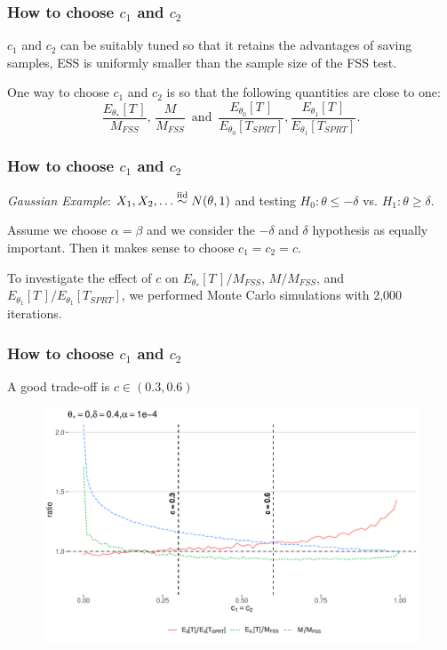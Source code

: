 \documentclass[10pt]{beamer}
\begin{document}
\begin{frame}
\frametitle{How to choose $c_1$ and $c_2$}

$c_1$ and $c_2$ can be suitably tuned so that it retains the advantages of saving samples, ESS is uniformly smaller than the sample size of the FSS test.

One way to choose $c_1$ and $c_2$ is so that the following quantities are close to one:
\[
\frac{E_{\theta_{*}}[T\,]}{M_{FSS}}, \, \frac{M}{M_{FSS}}  \, \text{ and } \, \frac{E_{\theta_0}[T\,]}{E_{\theta_0}[T_{SPRT}]}, \frac{E_{\theta_1}[T\,]}{E_{\theta_1}[T_{SPRT}]}.
\]

\end{frame}

\begin{frame}
\frametitle{How to choose $c_1$ and $c_2$}
\textit{Gaussian Example}: $X_1, X_2, \dots  \overset{\text{iid}}\sim N(\theta, 1)$ and testing $H_0: \theta \leq -\delta$ vs. $H_1: \theta \geq \delta$.

Assume we choose $\alpha = \beta$ and we consider the $-\delta$ and $\delta$ hypothesis as equally important. Then it makes sense to choose $c_1 = c_2 = c$.

To investigate the effect of $c$ on $E_{\theta_{*}}[T\,] / M_{FSS}$, $M / M_{FSS}$, and $E_{\theta_1}[T\,] / E_{\theta_1}[T_{SPRT}]$, we performed Monte Carlo simulations with 2,000 iterations.

\end{frame}

\begin{frame}
\frametitle{How to choose $c_1$ and $c_2$}
A good trade-off is $c \in (0.3, 0.6)$

\begin{figure}
\centering
\includegraphics[height=0.7\textheight]{images/c1_c2_ratios}
\end{figure}

\end{frame}
\end{document}
